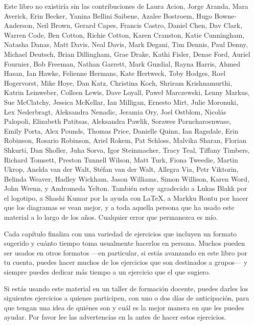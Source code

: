 
Este libro no existiría sin las contribuciones de
Laura Acion,
Jorge Aranda,
Mara Averick,
Erin Becker,
Yanina Bellini Saibene,
Azalee Bostroem,
Hugo Bowne-Anderson,
Neil Brown,
Gerard Capes,
Francis Castro,
Daniel Chen,
Dav Clark,
Warren Code,
Ben Cotton,
Richie Cotton,
Karen Cranston,
Katie Cunningham,
Natasha Danas,
Matt Davis,
Neal Davis,
Mark Degani,
Tim Dennis,
Paul Denny,
Michael Deutsch,
Brian Dillingham,
Grae Drake,
Kathi Fisler,
Denae Ford,
Auriel Fournier,
Bob Freeman,
Nathan Garrett,
Mark Guzdial,
Rayna Harris,
Ahmed Hasan,
Ian Hawke,
Felienne Hermans,
Kate Hertweck,
Toby Hodges,
Roel Hogervorst,
Mike Hoye,
Dan Katz,
Christina Koch,
Shriram Krishnamurthi,
Katrin Leinweber,
Colleen Lewis,
Dave Loyall,
Paweł Marczewski,
Lenny Markus,
Sue McClatchy,
Jessica McKellar,
Ian Milligan,
Ernesto Mirt,
Julie Moronuki,
Lex Nederbragt,
Aleksandra Nenadic,
Jeramia Ory,
Joel Ostblom,
Nicolás Palopoli,
Elizabeth Patitsas,
Aleksandra Pawlik,
Sorawee Porncharoenwase,
Emily Porta,
Alex Pounds,
Thomas Price,
Danielle Quinn,
Ian Ragsdale,
Erin Robinson,
Rosario Robinson,
Ariel Rokem,
Pat Schloss,
Malvika Sharan,
Florian Shkurti,
Dan Sholler,
Juha Sorva,
Igor Steinmacher,
Tracy Teal,
Tiffany Timbers,
Richard Tomsett,
Preston Tunnell Wilson,
Matt Turk,
Fiona Tweedie,
Martin Ukrop,
Anelda van der Walt,
Stéfan van der Walt,
Allegra Via,
Petr Viktorin,
Belinda Weaver,
Hadley Wickham,
Jason Williams,
Simon Willison,
Karen Word,
John Wrenn,
y Andromeda Yelton.
También estoy agradecido a Lukas Blakk por el logotipo,
a Shashi Kumar por la ayuda con LaTeX,
a Markku Rontu por hacer que los diagramas se vean mejor,
y a toda aquella persona que ha usado este material a lo largo de los años.
Cualquier error que permanezca es mío. 


Cada capítulo finaliza con una variedad de ejercicios que incluyen un formato sugerido y cuánto tiempo toma usualmente hacerlos en persona.
Muchos pueden ser usados en otros formatos ---en particular,
si estás avanzando en este libro por tu cuenta,
puedes hacer muchos de los ejercicios que son destinados a grupos--- y siempre
puedes dedicar más tiempo a un ejercicio que el que sugiero.

Si estás usando este material en un taller de formación docente,
puedes darles los siguientes ejercicios a quienes participen, con uno o dos días de anticipación,
para que tengan una idea de quiénes son y cuál es la mejor manera en que les puedes ayudar. 
Por favor lee las advertencias en la  antes de hacer estos ejercicios.

